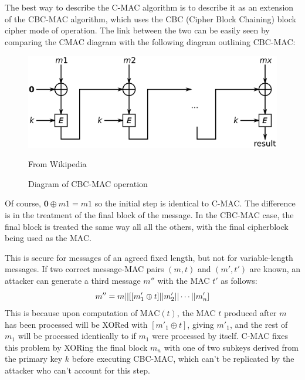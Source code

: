 \documentclass[12pt,a4paper]{article}
\begin{document}
The best way to describe the C-MAC algorithm \cite{cmac} is to describe it as an extension of the CBC-MAC algorithm, which uses the CBC (Cipher Block Chaining) block cipher mode of operation. The link between the two can be easily seen by comparing the CMAC diagram with the following diagram outlining CBC-MAC:

\begin{figure} [ht]
	\centering
	\includegraphics[scale=0.5]{implementation/CBC-MAC}
	\caption{Diagram of CBC-MAC operation}
	From Wikipedia \cite{TODO}
\end{figure}

Of course, $\mathbf{0} \oplus m1=m1$ so the initial step is identical to C-MAC. The difference is in the treatment of the final block of the message. In the CBC-MAC case, the final block is treated the same way all all the others, with the final cipherblock being used as the MAC.

This is secure for messages of an agreed fixed length, but not for variable-length messages. If two correct message-MAC pairs $(m,t)$ and $(m',t')$ are known, an attacker can generate a third message $m''$ with the MAC $t'$ as follows: 
$$m''=m||[[m'_1\oplus t] || m'_2 || \cdots \\ || m'_n]$$
This is because upon computation of $\text{MAC}(t)$, the MAC $t$ produced after $m$ has been processed will be XORed with $[m'_1 \oplus t]$, giving $m'_1$, and the rest of $m_1$ will be processed identically to if $m_1$ were processed by itself. C-MAC fixes this problem by XORing the final block $m_n$ with one of two subkeys derived from the primary key $k$ before executing CBC-MAC, which can't be replicated by the attacker who can't account for this step.


\pagebreak
\end{document}
